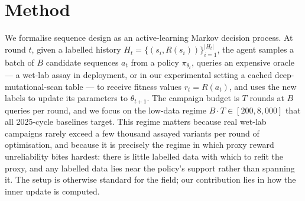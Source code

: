 \section{Method}
\label{sec:methods}

We formalise sequence design as an active-learning Markov decision process. At round $t$, given a labelled history $H_t = \{(s_i, R(s_i))\}_{i=1}^{|H_t|}$, the agent samples a batch of $B$ candidate sequences $a_t$ from a policy $\pi_{\theta_t}$, queries an expensive oracle --- a wet-lab assay in deployment, or in our experimental setting a cached deep-mutational-scan table --- to receive fitness values $r_t = R(a_t)$, and uses the new labels to update its parameters to $\theta_{t+1}$. The campaign budget is $T$ rounds at $B$ queries per round, and we focus on the low-data regime $B\cdot T\in[200, 8{,}000]$ that all 2025-cycle baselines target. This regime matters because real wet-lab campaigns rarely exceed a few thousand assayed variants per round of optimisation, and because it is precisely the regime in which proxy reward unreliability bites hardest: there is little labelled data with which to refit the proxy, and any labelled data lies near the policy's support rather than spanning it. The setup is otherwise standard for the field; our contribution lies in how the inner update is computed.

